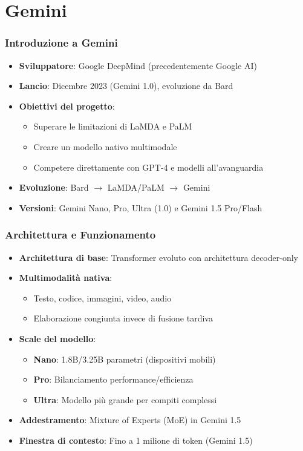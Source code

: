 \documentclass[aspectratio=169]{beamer}
\begin{document}
\section{Gemini}
%
%
\begin{frame}
\frametitle{Introduzione a Gemini}
\begin{itemize}
    \item \textbf{Sviluppatore}: Google DeepMind (precedentemente Google AI)
    \item \textbf{Lancio}: Dicembre 2023 (Gemini 1.0), evoluzione da Bard
    \item \textbf{Obiettivi del progetto}:
    \begin{itemize}
        \item Superare le limitazioni di LaMDA e PaLM
        \item Creare un modello nativo multimodale
        \item Competere direttamente con GPT-4 e modelli all'avanguardia
    \end{itemize}
    \item \textbf{Evoluzione}: Bard $\rightarrow$ LaMDA/PaLM $\rightarrow$ Gemini
    \item \textbf{Versioni}: Gemini Nano, Pro, Ultra (1.0) e Gemini 1.5 Pro/Flash
\end{itemize}
\end{frame}
%
%
\begin{frame}
\frametitle{Architettura e Funzionamento}
\begin{itemize}
    \item \textbf{Architettura di base}: Transformer evoluto con architettura decoder-only
    \item \textbf{Multimodalità nativa}:
    \begin{itemize}
        \item Testo, codice, immagini, video, audio
        \item Elaborazione congiunta invece di fusione tardiva
    \end{itemize}
    \item \textbf{Scale del modello}:
    \begin{itemize}
        \item \textbf{Nano}: 1.8B/3.25B parametri (dispositivi mobili)
        \item \textbf{Pro}: Bilanciamento performance/efficienza
        \item \textbf{Ultra}: Modello più grande per compiti complessi
    \end{itemize}
    \item \textbf{Addestramento}: Mixture of Experts (MoE) in Gemini 1.5
    \item \textbf{Finestra di contesto}: Fino a 1 milione di token (Gemini 1.5)
\end{itemize}
\end{frame}
\end{document}
